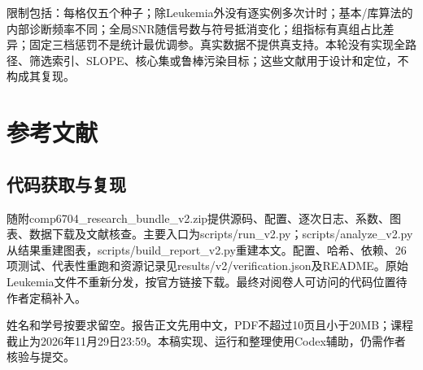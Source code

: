\documentclass[UTF8,fontset=fandol,10pt]{ctexart}
\begin{document}
限制包括：每格仅五个种子；除Leukemia外没有逐实例多次计时；基本/库算法的内部诊断频率不同；全局SNR随信号数与符号抵消变化；组指标有真组占比差异；固定三档惩罚不是统计最优调参。真实数据不提供真支持。本轮没有实现全路径、筛选索引、SLOPE、核心集或鲁棒污染目标；这些文献用于设计和定位，不构成其复现。

\clearpage
\section*{参考文献}
\renewcommand{\refname}{}
\subsection*{代码获取与复现}
随附comp6704\_research\_bundle\_v2.zip提供源码、配置、逐次日志、系数、图表、数据下载及文献核查。主要入口为scripts/run\_v2.py；scripts/analyze\_v2.py从结果重建图表，scripts/build\_report\_v2.py重建本文。配置、哈希、依赖、26项测试、代表性重跑和资源记录见results/v2/verification.json及README。原始Leukemia文件不重新分发，按官方链接下载。最终对阅卷人可访问的代码位置待作者定稿补入。

姓名和学号按要求留空。报告正文先用中文，PDF不超过10页且小于20MB；课程截止为2026年11月29日23:59。本稿实现、运行和整理使用Codex辅助，仍需作者核验与提交。
\end{document}
